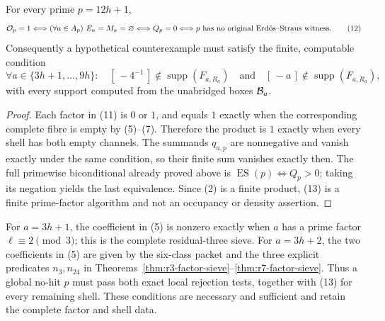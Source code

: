 \begin{theorem}
\label{thm:global-no-hit}
For every prime \(p=12h+1\),
\[
 {\mathcal O}_p=1
 \Longleftrightarrow
 (\forall a\in A_p)\ E_a=M_a=\varnothing
 \Longleftrightarrow Q_p=0
 \Longleftrightarrow
 \text{\(p\) has no original Erd\H{o}s--Straus witness}. \tag{12}
\]
Consequently a hypothetical counterexample must satisfy the finite,
computable condition
\[
 \forall a\in\{3h+1,\ldots,9h\}:\quad
 [\,-4^{-1}\,]\notin\operatorname{supp}(F_{a,R_a})
 \quad\text{and}\quad
 [\,-a\,]\notin\operatorname{supp}(F_{a,R_a}), \tag{13}
\]
with every support computed from the unabridged boxes \({\cal B}_a\).

\begin{proof}
Each factor in (11) is \(0\) or \(1\), and equals \(1\) exactly
when the corresponding complete fibre is empty by (5)--(7).
Therefore the product is \(1\) exactly when every shell has both
empty channels. The summands \(q_{a,p}\) are nonnegative and
vanish exactly under the same condition, so their finite sum
vanishes exactly then. The full primewise biconditional already
proved above is \(\operatorname{ES}(p)\Longleftrightarrow Q_p>0\);
taking its negation yields the last equivalence. Since (2) is a
finite product, (13) is a finite prime-factor algorithm and not an
occupancy or density assertion.
\end{proof}
\end{theorem}

\begin{corollary}
\label{cor:global-r3-r7}
For \(a=3h+1\), the coefficient in (5) is nonzero exactly when
\(a\) has a prime factor \(\ell\equiv2\pmod3\); this is the
complete residual-three sieve. For \(a=3h+2\), the two
coefficients in (5) are given by the six-class packet and the
three explicit predicates \(n_3,n_{24}\) in
Theorems~\ref{thm:r3-factor-sieve}--\ref{thm:r7-factor-sieve}.
Thus a global no-hit \(p\) must pass both exact local rejection tests,
together with (13) for every remaining shell. These conditions
are necessary and sufficient and retain the complete factor and
shell data.
\end{corollary}

